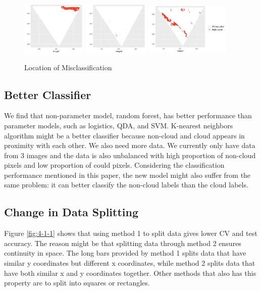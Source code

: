 \documentclass[11pt]{article}
\begin{document}
\begin{figure}[h]
\includegraphics[width=0.28\textwidth]{4-2-6.jpeg}
\includegraphics[width=0.28\textwidth]{4-2-7.jpeg}
\includegraphics[width=0.36\textwidth]{4-2-8.jpeg}
\centering
\caption{Location of Misclassification}
\label{fig:4-2-2}
\centering
\end{figure}


\subsection{Better Classifier}

We find that non-parameter model, random forest, has better performance than parameter models, such as logistics, QDA, and SVM. K-nearest neighbors algorithm might be a better classifier because non-cloud and cloud appears in proximity with each other. We also need more data. We currently only have data from 3 images and the data is also unbalanced with high proportion of non-cloud pixels and low proportion of could pixels. Considering the classification performance mentioned in this paper, the new model might also suffer from the same problem: it can better classify the non-cloud labels than the cloud labels.


\subsection{Change in Data Splitting}

Figure \ref{fig:4-1-1} shows that using method 1 to split data gives lower CV and test accuracy. The reason might be that splitting data through method 2 ensures continuity in space. The long bars provided by method 1 splits data that have similar y coordinates but different x coordinates, while method 2 splits data that have both similar x and y coordinates together. Other methods that also has this property are to split into squares or rectangles. 
\end{document}
